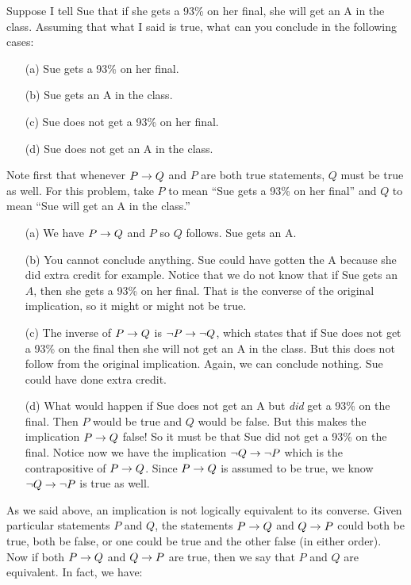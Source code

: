 \documentclass[12pt]{article}
\begin{document}
\begin{example}
  Suppose I tell Sue that if she gets a 93\% on her final, she will get an A in the class.  Assuming that what I said is true, what can you conclude in the following cases:
  \begin{itemize}
    \item[(a)] Sue gets a 93\% on her final.
    \item[(b)] Sue gets an A in the class.
    \item[(c)] Sue does not get a 93\% on her final.
    \item[(d)] Sue does not get an A in the class.
  \end{itemize}
  \begin{solution} Note first that whenever $P \rightarrow Q$ and $P$ are both true statements, $Q$ must be true as well.  For this problem, take $P$ to mean ``Sue gets a 93\% on her final'' and $Q$ to mean ``Sue will get an A in the class.''
    \begin{itemize}
      \item[(a)] We have $P \rightarrow Q$ and $P$ so $Q$ follows. Sue gets an A.
      \item[(b)] You cannot conclude anything. Sue could have gotten the A because she did extra credit for example.  Notice that we do not know that if Sue gets an $A$, then she gets a 93\% on her final. That is the converse of the original implication, so it might or might not be true.
      \item[(c)] The inverse of $P \rightarrow Q$ is $\neg P \rightarrow \neg Q$, which states that if Sue does not get a 93\% on the final then she will not get an A in the class.  But this does not follow from the original implication.  Again, we can conclude nothing.  Sue could have done extra credit.
      \item[(d)] What would happen if Sue does not get an A but {\em did} get a 93\% on the final.  Then $P$ would be true and $Q$ would be false.  But this makes the implication $P \rightarrow Q$ false!  So it must be that Sue did not get a 93\% on the final.  Notice now we have the implication $\neg Q \rightarrow \neg P$ which is the contrapositive of $P \rightarrow Q$.  Since $P \rightarrow Q$ is assumed to be true, we know $\neg Q \rightarrow \neg P$ is true as well.
    \end{itemize}
  \end{solution}
\end{example}

As we said above, an implication is not logically equivalent to its converse.  Given particular statements $P$ and $Q$, the statements $P \rightarrow Q$ and $Q \rightarrow P$ could both be true, both be false, or one could be true and the other false (in either order).  Now if both $P \rightarrow Q$ and $Q \rightarrow P$ are true, then we say that $P$ and $Q$ are equivalent.  In fact, we have:
\end{document}
